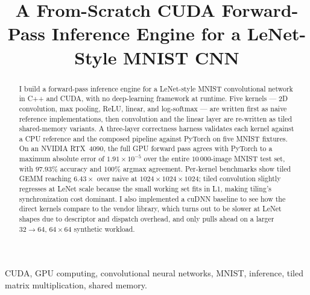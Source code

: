 \documentclass[conference]{IEEEtran}
\begin{document}
\title{A From-Scratch CUDA Forward-Pass Inference Engine for a LeNet-Style MNIST CNN}

\author{
}

\maketitle

\begin{abstract}
I build a forward-pass inference engine for a LeNet-style MNIST
convolutional network in C++ and CUDA, with no deep-learning framework
at runtime. Five kernels --- 2D convolution, max pooling, ReLU, linear,
and log-softmax --- are written first as naive reference
implementations, then convolution and the linear layer are re-written
as tiled shared-memory variants. A three-layer correctness harness
validates each kernel against a CPU reference and the composed pipeline
against PyTorch on five MNIST fixtures. On an NVIDIA RTX~4090, the
full GPU forward pass agrees with PyTorch to a maximum absolute error
of $1.91\times10^{-5}$ over the entire $10\,000$-image MNIST test set,
with $97.93\%$ accuracy and 100\% argmax agreement.
Per-kernel benchmarks show tiled GEMM reaching $6.43\times$ over naive
at $1024\times1024\times1024$; tiled convolution slightly regresses at
LeNet scale because the small working set fits in L1, making tiling's
synchronization cost dominant. I also implemented a cuDNN baseline to
see how the direct kernels compare to the vendor library, which turns
out to be slower at LeNet shapes due to descriptor and dispatch
overhead, and only pulls ahead on a larger $32{\to}64$, $64\times64$
synthetic workload.
\end{abstract}

\begin{IEEEkeywords}
CUDA, GPU computing, convolutional neural networks, MNIST, inference,
tiled matrix multiplication, shared memory.
\end{IEEEkeywords}
\end{document}
